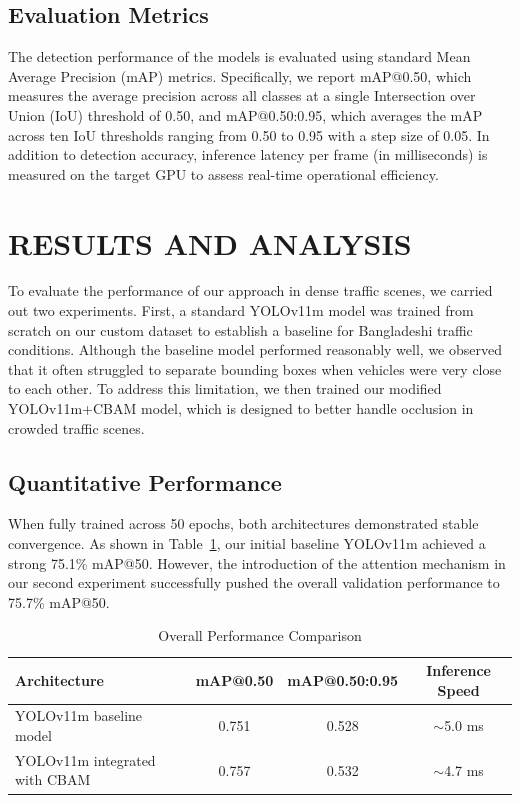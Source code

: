 \documentclass[sigconf]{acmart}
\begin{document}
\subsection{Evaluation Metrics}
The detection performance of the models is evaluated using standard Mean Average Precision (mAP) metrics. Specifically, we report mAP@0.50, which measures the average precision across all classes at a single Intersection over Union (IoU) threshold of 0.50, and mAP@0.50:0.95, which averages the mAP across ten IoU thresholds ranging from 0.50 to 0.95 with a step size of 0.05. In addition to detection accuracy, inference latency per frame (in milliseconds) is measured on the target GPU to assess real-time operational efficiency.


\section{RESULTS AND ANALYSIS}
To evaluate the performance of our approach in dense traffic scenes, we carried out two experiments. First, a standard YOLOv11m model was trained from scratch on our custom dataset to establish a baseline for Bangladeshi traffic conditions. Although the baseline model performed reasonably well, we observed that it often struggled to separate bounding boxes when vehicles were very close to each other. To address this limitation, we then trained our modified YOLOv11m+CBAM model, which is designed to better handle occlusion in crowded traffic scenes.

\subsection{Quantitative Performance}
When fully trained across 50 epochs, both architectures demonstrated stable convergence. As shown in Table~\ref{tab:ablation_overall}, our initial baseline YOLOv11m achieved a strong 75.1\% mAP@50. However, the introduction of the attention mechanism in our second experiment successfully pushed the overall validation performance to 75.7\% mAP@50.


\begin{table}[htbp]
  \caption{Overall Performance Comparison}
  \label{tab:ablation_overall}
  \begin{tabular}{lccc}
    \toprule
    \textbf{Architecture} & \textbf{mAP@0.50} & \textbf{mAP@0.50:0.95} & \textbf{Inference Speed} \\
    \midrule
    YOLOv11m baseline model       & 0.751 & 0.528 & $\sim$5.0 ms \\ 
    YOLOv11m integrated with CBAM & 0.757 & 0.532 & $\sim$4.7 ms \\
    \bottomrule
  \end{tabular}
\end{table}
\end{document}
